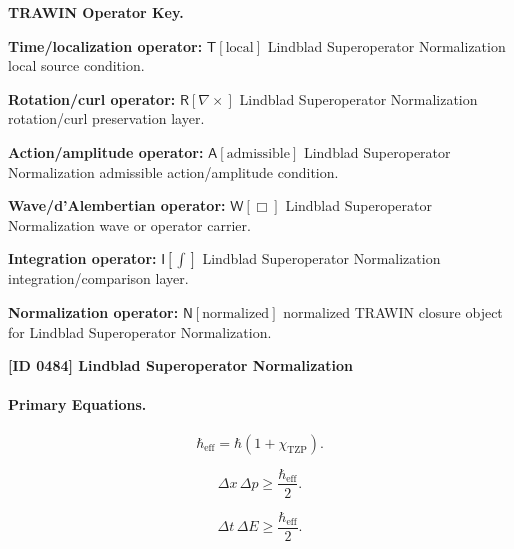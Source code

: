 \par\vspace{0.45\baselineskip}
\noindent\begin{minipage}[t]{\linewidth}
\begingroup
\small
\raggedright
\textbf{TRAWIN Operator Key.}\par
\noindent\textbf{Time/localization operator:} $\mathsf{T}\!\left[\mathrm{local}\right]$ Lindblad Superoperator Normalization local source condition.\par
\noindent\textbf{Rotation/curl operator:} $\mathsf{R}\!\left[\nabla\times\right]$ Lindblad Superoperator Normalization rotation/curl preservation layer.\par
\noindent\textbf{Action/amplitude operator:} $\mathsf{A}\!\left[\mathrm{admissible}\right]$ Lindblad Superoperator Normalization admissible action/amplitude condition.\par
\noindent\textbf{Wave/d'Alembertian operator:} $\mathsf{W}\!\left[\Box\right]$ Lindblad Superoperator Normalization wave or operator carrier.\par
\noindent\textbf{Integration operator:} $\mathsf{I}\!\left[\int\right]$ Lindblad Superoperator Normalization integration/comparison layer.\par
\noindent\textbf{Normalization operator:} $\mathsf{N}\!\left[\mathrm{normalized}\right]$ normalized TRAWIN closure object for Lindblad Superoperator Normalization.\par
\endgroup
\end{minipage}

\clearpage
\noindent\textbf{[ID 0484] Lindblad Superoperator Normalization}\par
\vspace{0.35em}
\paragraph{Primary Equations.}
\begin{equation}
\hbar_{\mathrm{eff}}
=
\hbar(1+\chi_{\mathrm{TZP}}).
\end{equation}

\begin{equation}
\Delta x\,\Delta p
\geq
\frac{\hbar_{\mathrm{eff}}}{2}.
\end{equation}

\begin{equation}
\Delta t\,\Delta E
\geq
\frac{\hbar_{\mathrm{eff}}}{2}.
\end{equation}

